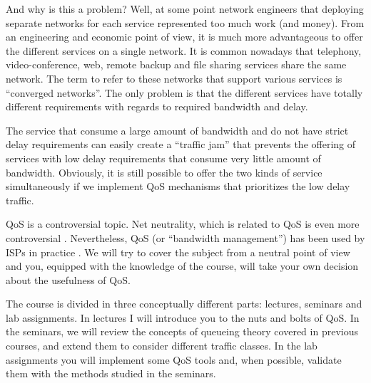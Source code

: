 And why is this a problem? Well, at some point network engineers that deploying separate networks for each service represented too much work (and money).
From an engineering and economic point of view, it is much more advantageous to offer the different services on a single network.
It is common nowadays that telephony, video-conference, web, remote backup and file sharing services share the same network.
The term to refer to these networks that support various services is ``converged networks''.
The only problem is that the different services have totally different requirements with regards to required bandwidth and delay.

The service that consume a large amount of bandwidth and do not have strict delay requirements can easily create a ``traffic jam'' that prevents the offering of services with low delay requirements that consume very little amount of bandwidth.
Obviously, it is still possible to offer the two kinds of service simultaneously if we implement QoS mechanisms that prioritizes the low delay traffic.

QoS is a controversial topic.
Net neutrality, which is related to QoS is even more controversial \cite{bachula2006}.
Nevertheless, QoS (or ``bandwidth management'') has been used by ISPs in practice \cite{cooper2011bum}.
We will try to cover the subject from a neutral point of view and you, equipped with the knowledge of the course, will take your own decision about the usefulness of QoS.

The course is divided in three conceptually different parts: lectures, seminars and lab assignments.
In lectures I will introduce you to the nuts and bolts of QoS.
In the seminars, we will review the concepts of queueing theory covered in previous courses, and extend them to consider different traffic classes.
In the lab assignments you will implement some QoS tools and, when possible, validate them with the methods studied in the seminars.

